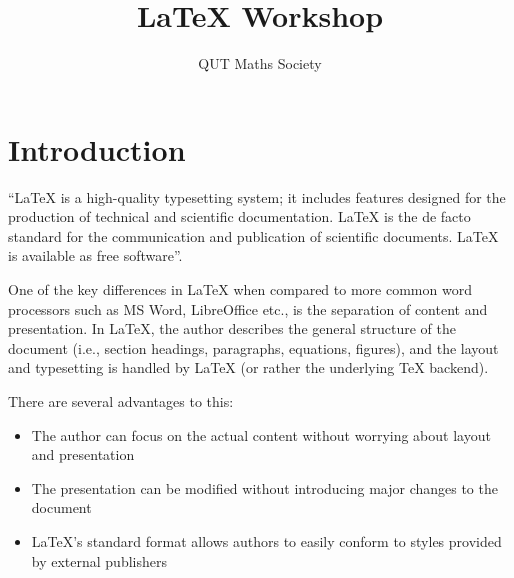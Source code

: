 \documentclass[11pt, twoside]{article}
\title{\LaTeX{} Workshop}
\author{QUT Maths Society}
\begin{document}

\maketitle


\tableofcontents

\listoffigures
\listoftables

\newpage
{}


\section{Introduction}

``\LaTeX{} is a high-quality typesetting system; it includes features designed for the production of technical and scientific documentation. \LaTeX{} is the de facto standard for the communication and publication of scientific documents. \LaTeX{} is available as free software''. \parencite{latex_project_latex_2018}

One of the key differences in \LaTeX{} when compared to more common word processors such as MS Word, LibreOffice etc., is the separation of content and presentation. In \LaTeX{}, the author describes the general structure of the document (i.e., section headings, paragraphs, equations, figures), and the layout and typesetting is handled by \LaTeX{} (or rather the underlying \TeX{} backend).

There are several advantages to this:
\begin{itemize}
    \item The author can focus on the actual content without worrying about layout and presentation
    \item The presentation can be modified without introducing major changes to the document
    \item \LaTeX{}'s standard format allows authors to easily conform to styles provided by external publishers
\end{itemize}
\end{document}
